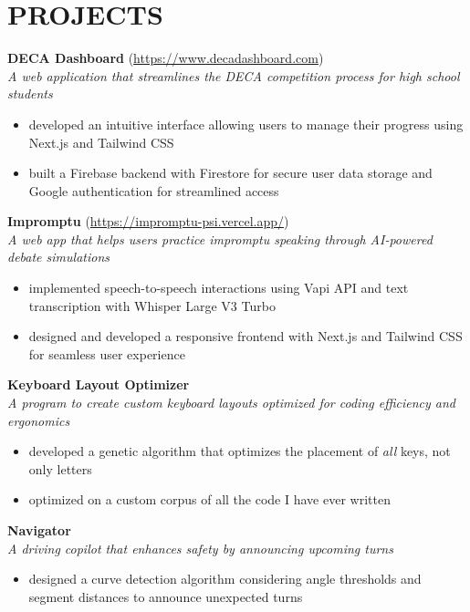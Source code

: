 \section*{PROJECTS}


\noindent
\textbf{DECA Dashboard} (\href{https://www.decadashboard.com}{https://www.decadashboard.com}) \\
\textit{A web application that streamlines the DECA competition process for high school students}
\begin{itemize}
	\item developed an intuitive interface allowing users to manage their progress using Next.js and Tailwind CSS
	\item built a Firebase backend with Firestore for secure user data storage and Google authentication for streamlined access
\end{itemize}

\noindent
\textbf{Impromptu} (\href{https://impromptu-psi.vercel.app/}{https://impromptu-psi.vercel.app/}) \\
\textit{A web app that helps users practice impromptu speaking through AI-powered debate simulations}
\begin{itemize}
  \item implemented speech-to-speech interactions using Vapi API and text transcription with Whisper Large V3 Turbo
  \item designed and developed a responsive frontend with Next.js and Tailwind CSS for seamless user experience
\end{itemize}

\noindent
\textbf{Keyboard Layout Optimizer} \\
\textit{A program to create custom keyboard layouts optimized for coding efficiency and ergonomics}
\begin{itemize}
  \item developed a genetic algorithm that optimizes the placement of \textit{all} keys, not only letters
  \item optimized on a custom corpus of all the code I have ever written
\end{itemize}

\noindent
\textbf{Navigator} \\
\textit{A driving copilot that enhances safety by announcing upcoming turns}
\begin{itemize}
  \item designed a curve detection algorithm considering angle thresholds and segment distances to announce unexpected turns
\end{itemize}
